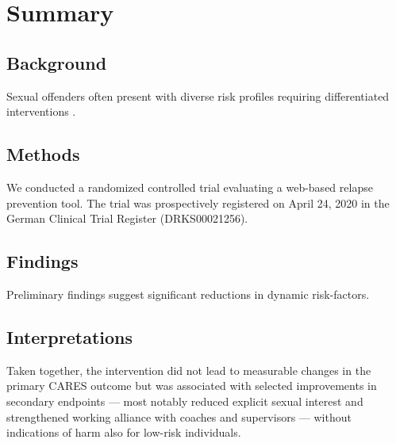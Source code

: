 \documentclass[
  super,
  preprint,
  1p,
  onecolumn]{elsarticle}
\begin{document}
\begin{frontmatter}















        





\end{frontmatter}
    

\section*{Summary}\label{summary}

\subsection*{Background}\label{background}

Sexual offenders often present with diverse risk profiles requiring
differentiated interventions \citep{knuth84}.

\subsection*{Methods}\label{methods}

We conducted a randomized controlled trial evaluating a web-based
relapse prevention tool. The trial was prospectively registered on April
24, 2020 in the German Clinical Trial Register (DRKS00021256).

\subsection*{Findings}\label{findings}

Preliminary findings suggest significant reductions in dynamic
risk-factors.

\subsection*{Interpretations}\label{interpretations}

Taken together, the intervention did not lead to measurable changes in
the primary CARES outcome but was associated with selected improvements
in secondary endpoints --- most notably reduced explicit sexual interest
and strengthened working alliance with coaches and supervisors ---
without indications of harm also for low-risk individuals.
\end{document}
